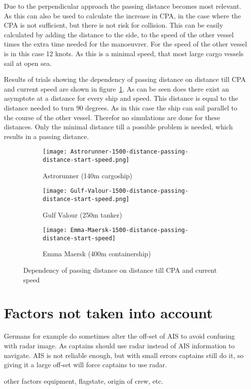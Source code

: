 Due to the perpendicular approach the passing distance becomes most relevant. As this can also be used to calculate the increase in CPA, in the case where the CPA is not sufficient, but there is not risk for collision. This can be easily calculated by adding the distance to the side, to the speed of the other vessel times the extra time needed for the manoeuvrer. For the speed of the other vessel is in this case 12 knots. As this is a minimal speed, that most large cargo vessels sail at open sea. 

Results of trials showing the dependency of passing distance on distance till CPA and current speed are shown in figure~\ref{fig:result-distance-passing-distance-start-speed}.
As can be seen does there exist an asymptote at a distance for every ship and speed. This distance is equal to the distance needed to turn 90 degrees. As in this case the ship can sail parallel to the course of the other vessel. Therefor no simulations are done for these distances. Only the minimal distance till a possible problem is needed, which results in a passing distance. 

\begin{figure}[!p]
	\centering
	\begin{subfigure}[b]{0.6\textwidth}
		\texttt{[image: Astrorunner-1500-distance-passing-distance-start-speed.png]} 
		\caption{Astrorunner (140m  cargoship)} 
	\end{subfigure}
	\begin{subfigure}[b]{0.6\linewidth}
		\texttt{[image: Gulf-Valour-1500-distance-passing-distance-start-speed.png]} 
		\caption{Gulf Valour (250m tanker)} 
	\end{subfigure}
	\begin{subfigure}[b]{0.6\textwidth}
		\texttt{[image: Emma-Maersk-1500-distance-passing-distance-start-speed]} 
		\caption{Emma Maersk (400m containership)} 
	\end{subfigure}
	\caption{Dependency of passing distance on distance till CPA and current speed} 
	\label{fig:result-distance-passing-distance-start-speed} 
\end{figure}

\section{Factors not taken into account}

Germans for example do sometimes alter the off-set of AIS to avoid confusing with radar image. As captains should use radar instead of AIS information to navigate. AIS is not reliable enough, but with small errors captains still do it, so giving it a large off-set will force captains to use radar.

other factors equipment, flagstate, origin of crew, etc.

